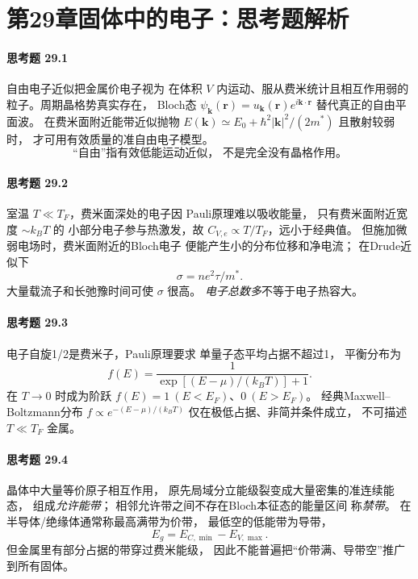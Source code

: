 \section*{第29章\quad 固体中的电子：思考题解析}
\paragraph{思考题 29.1}
自由电子近似把金属价电子视为
在体积 \(V\) 内运动、服从费米统计且相互作用弱的
粒子。周期晶格势真实存在，
Bloch态 \(\psi_{\boldsymbol k}(\boldsymbol r)
=u_{\boldsymbol k}(\boldsymbol r)e^{i\boldsymbol k\cdot\boldsymbol r}\)
替代真正的自由平面波。
在费米面附近能带近似抛物
\(E(\boldsymbol k)\simeq E_0+
\hbar^2|\boldsymbol k|^2/(2m^*)\) 且散射较弱时，
才可用有效质量的准自由电子模型。
\[
\boxed{\text{“自由”指有效低能运动近似，
不是完全没有晶格作用。}}
\]

\paragraph{思考题 29.2}
室温 \(T\ll T_F\)，费米面深处的电子因
Pauli原理难以吸收能量，
只有费米面附近宽度 \(\sim k_BT\) 的
小部分电子参与热激发，故
\(C_{V,e}\propto T/T_F\)，远小于经典值。
但施加微弱电场时，费米面附近的Bloch电子
便能产生小的分布位移和净电流；
在Drude近似下
\[
\boxed{\sigma=ne^2\tau/m^*}.
\]
大量载流子和长弛豫时间可使
\(\sigma\) 很高。
\emph{电子总数多}不等于电子热容大。

\paragraph{思考题 29.3}
电子自旋1/2是费米子，Pauli原理要求
单量子态平均占据不超过1，
平衡分布为
\[
\boxed{f(E)=\frac1{\exp[(E-\mu)/(k_BT)]+1}}.
\]
在 \(T\to0\) 时成为阶跃
\(f(E)=1\ (E<E_F)\)、\(0\ (E>E_F)\)。
经典Maxwell--Boltzmann分布
\(f\propto e^{-(E-\mu)/(k_BT)}\)
仅在极低占据、非简并条件成立，
不可描述 \(T\ll T_F\) 金属。

\paragraph{思考题 29.4}
晶体中大量等价原子相互作用，
原先局域分立能级裂变成大量密集的准连续能态，
组成\emph{允许能带}；
相邻允许带之间不存在Bloch本征态的能量区间
称\emph{禁带}。
在半导体/绝缘体通常称最高满带为价带，
最低空的低能带为导带，
\[
\boxed{E_g=E_{C,\min}-E_{V,\max}}.
\]
但金属里有部分占据的带穿过费米能级，
因此不能普遍把“价带满、导带空”推广到所有固体。

